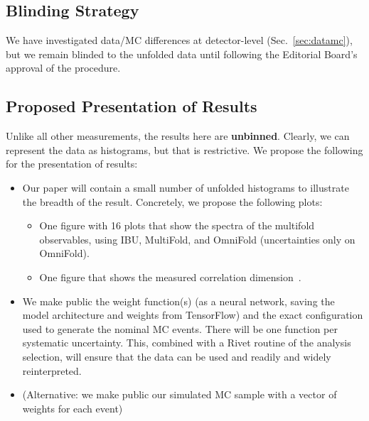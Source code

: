 \subsection{Blinding Strategy}

We have investigated data/MC differences at detector-level (Sec.~\ref{sec:datamc}), but we remain blinded to the unfolded data until following the Editorial Board's approval of the procedure.

\subsection{Proposed Presentation of Results}

Unlike all other measurements, the results here are \textbf{unbinned}.  Clearly, we can represent the data as histograms, but that is restrictive.  We propose the following for the presentation of results:

\begin{itemize}
        \item Our paper will contain a small number of unfolded histograms to illustrate the breadth of the result.  Concretely, we propose the following plots:
        		\begin{itemize}
			\item One figure with 16 plots that show the spectra of the multifold observables, using IBU, MultiFold, and OmniFold (uncertainties only on OmniFold).
			\item One figure that shows the measured correlation dimension~\cite{Komiske:2019fks}.
		\end{itemize}
        \item We make public the weight function(s) (as a neural network, saving the model architecture and weights from TensorFlow) and the exact configuration used to generate the nominal MC events.  There will be one function per systematic uncertainty.  This, combined with a Rivet routine of the analysis selection, will ensure that the data can be used and readily and widely reinterpreted.
        \item (Alternative: we make public our simulated MC sample with a vector of weights for each event)
\end{itemize}

